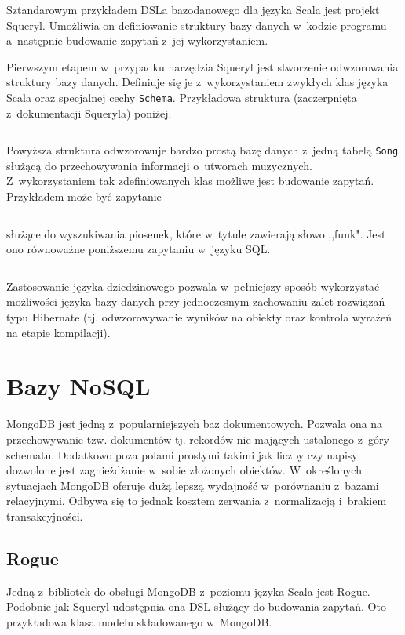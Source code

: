 \documentclass[brudnopis]{xmgr}
\begin{document}
Sztandarowym przykładem DSLa bazodanowego dla języka Scala jest projekt Squeryl. Umożliwia on definiowanie struktury bazy danych w~kodzie programu a~następnie budowanie zapytań z~jej wykorzystaniem.

Pierwszym etapem w~przypadku narzędzia Squeryl jest stworzenie odwzorowania struktury bazy danych. Definiuje się je z~wykorzystaniem zwykłych klas języka Scala oraz specjalnej cechy \texttt{Schema}. Przykładowa struktura (zaczerpnięta z~dokumentacji Squeryla\cite{squeryl_schemadefinition}) poniżej.

\inputminted{scala}{listings/scala/squeryl-schema.scala}

Powyższa struktura odwzorowuje bardzo prostą bazę danych z~jedną tabelą \texttt{Song} służącą do przechowywania informacji o~utworach muzycznych. Z~wykorzystaniem tak zdefiniowanych klas możliwe jest budowanie zapytań. Przykładem może być zapytanie

\inputminted{scala}{listings/scala/squeryl-query.scala}

\noindent służące do wyszukiwania piosenek, które w~tytule zawierają słowo ,,funk". Jest ono równoważne poniższemu zapytaniu w~języku SQL.

\inputminted{sql}{listings/sql/squeryl-query.sql}

Zastosowanie języka dziedzinowego pozwala w~pełniejszy sposób wykorzystać możliwości języka bazy danych przy jednoczesnym zachowaniu zalet rozwiązań typu Hibernate (tj. odwzorowywanie wyników na obiekty oraz kontrola wyrażeń na etapie kompilacji).

\section{Bazy NoSQL}

MongoDB jest jedną z~popularniejszych baz dokumentowych. Pozwala ona na przechowywanie tzw. dokumentów tj. rekordów nie mających ustalonego z~góry schematu. Dodatkowo poza polami prostymi takimi jak liczby czy napisy dozwolone jest zagnieżdżanie w~sobie złożonych obiektów. W~określonych sytuacjach MongoDB oferuje dużą lepszą wydajność w~porównaniu z~bazami relacyjnymi. Odbywa się to jednak kosztem zerwania z~normalizacją i~brakiem transakcyjności.

\subsection{Rogue}

Jedną z~bibliotek do obsługi MongoDB z~poziomu języka Scala jest Rogue. Podobnie jak Squeryl udostępnia ona DSL służący do budowania zapytań. Oto przykładowa klasa modelu składowanego w~MongoDB.
\end{document}
